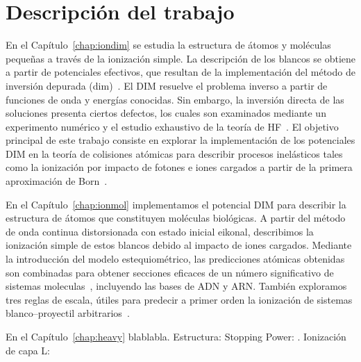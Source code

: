 
\section{Descripción del trabajo}

En el Capítulo~\ref{chap:iondim} se estudia la estructura de átomos y 
moléculas pequeñas a través de la ionización simple. La descripción de 
los blancos se obtiene a partir de potenciales efectivos, que resultan 
de la implementación del método de inversión depurada 
(\acs{dim})~\cite{Mendez:16,Mendez:19dim}. El DIM resuelve el problema 
inverso a partir de funciones de onda y energías conocidas. Sin embargo, 
la inversión directa de las soluciones presenta ciertos defectos, los 
cuales son examinados mediante un experimento numérico y el estudio 
exhaustivo de la teoría de HF~\cite{Mendez:18,Mitnik:19}. El objetivo 
principal de este trabajo consiste en explorar la implementación de los
potenciales DIM en la teoría de colisiones atómicas para describir 
procesos inelásticos tales como la ionización por impacto de fotones e 
iones cargados a partir de la primera aproximación de 
Born~\cite{Mendez:19dim}. 

En el Capítulo~\ref{chap:ionmol} implementamos el potencial DIM para 
describir la estructura de átomos que constituyen moléculas biológicas.
A partir del método de onda continua distorsionada con estado inicial 
eikonal, describimos la ionización simple de estos blancos debido al 
impacto de iones cargados. Mediante la introducción del modelo  
estequiométrico, las predicciones atómicas obtenidas son combinadas para  
obtener secciones eficaces de un número significativo de sistemas 
moleculas~\cite{Mendez:20ionmol}, incluyendo las bases de ADN y 
ARN. También exploramos tres reglas de escala, útiles para predecir a 
primer orden la ionización de sistemas blanco--proyectil 
arbitrarios~\cite{Mendez:20scale}. 

En el Capítulo~\ref{chap:heavy} blablabla. 
Estructura: \cite{Mendez:19relat} 
Stopping Power: \cite{Montanari:20}.
Ionización de capa L: \cite{Oswald:20}

